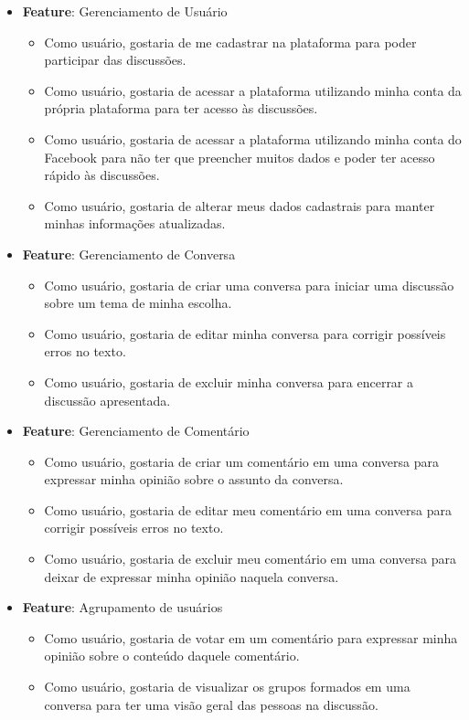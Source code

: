     \begin{itemize}
	\item \textbf{Feature}:  Gerenciamento de Usuário
	    \begin{itemize}
		\item Como usuário, gostaria de me cadastrar na plataforma para poder participar das discussões.
		\item Como usuário, gostaria de acessar a plataforma utilizando minha conta da própria plataforma para ter acesso às discussões.
		\item Como usuário, gostaria de acessar a plataforma utilizando minha conta do Facebook para não ter que preencher muitos dados e poder ter acesso rápido às discussões.
		\item Como usuário, gostaria de alterar meus dados cadastrais para manter minhas informações atualizadas.
	    \end{itemize}
	    
	\item \textbf{Feature}: Gerenciamento de Conversa
	    \begin{itemize}
		\item Como usuário, gostaria de criar uma conversa para iniciar uma discussão sobre um tema de minha escolha. 
		\item Como usuário, gostaria de editar minha conversa para corrigir possíveis erros no texto. 
		\item Como usuário, gostaria de excluir minha conversa para encerrar a discussão apresentada.
	    \end{itemize}
	    
	\item \textbf{Feature}: Gerenciamento de Comentário
	    \begin{itemize}
		\item Como usuário, gostaria de criar um comentário em uma conversa para expressar minha opinião sobre o assunto da conversa. 
		\item Como usuário, gostaria de editar meu comentário em uma conversa para corrigir possíveis erros no texto. 
		\item Como usuário, gostaria de excluir meu comentário em uma conversa para deixar de expressar minha opinião naquela conversa. 
	    \end{itemize}
	    
	\item \textbf{Feature}: Agrupamento de usuários
	    \begin{itemize}
		\item Como usuário, gostaria de votar em um comentário para expressar minha opinião sobre o conteúdo daquele comentário.
		\item Como usuário, gostaria de visualizar os grupos formados em uma conversa para ter uma visão geral das pessoas na discussão.
	    \end{itemize}
    \end{itemize}
